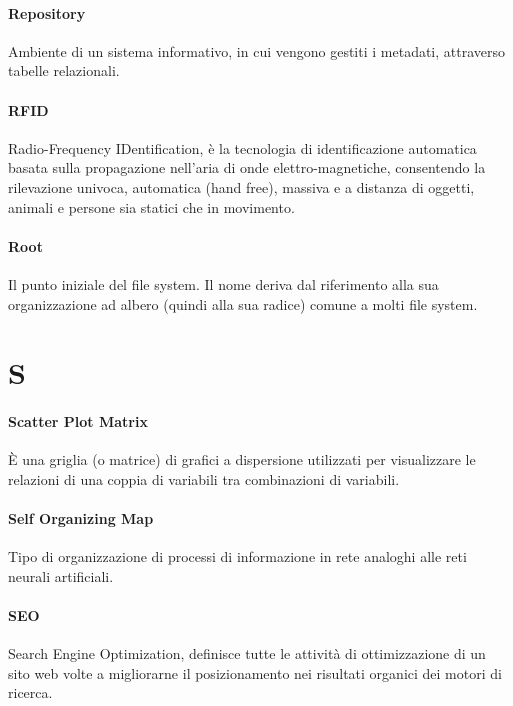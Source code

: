 \documentclass[]{article}
\begin{document}
	\paragraph*{Repository}
	Ambiente di un sistema informativo, in cui vengono gestiti i metadati, attraverso tabelle relazionali.
	
	\paragraph*{RFID}
	Radio-Frequency IDentification, è la tecnologia di identificazione automatica basata sulla propagazione nell'aria di onde elettro-magnetiche, consentendo la rilevazione univoca, automatica (hand free), massiva e a distanza di oggetti, animali e persone sia statici che in movimento.
	
	\paragraph*{Root}
	Il punto iniziale del file system. Il nome deriva dal riferimento alla sua organizzazione ad albero (quindi alla sua radice) comune a molti file system.
		
	\newpage
	
	\section*{S}
	
	\paragraph*{Scatter Plot Matrix}
	È una griglia (o matrice) di grafici a dispersione utilizzati per visualizzare le relazioni di una coppia di variabili tra combinazioni di variabili.
	
	\paragraph*{Self Organizing Map}
	Tipo di organizzazione di processi di informazione in rete analoghi alle reti neurali artificiali.
	
	\paragraph*{SEO}
	Search Engine Optimization, definisce tutte le attività di ottimizzazione di un sito web volte a migliorarne il posizionamento nei risultati organici dei motori di ricerca.
	
\end{document}
